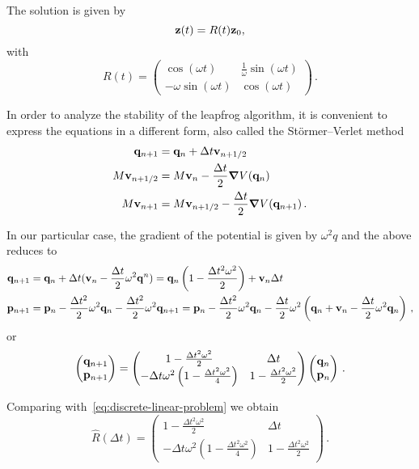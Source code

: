 \documentclass[class=report, crop=false]{standalone}
\begin{document}
The solution is given by
\[
\vb{z}(t) = R(t) \vb{z}_0,
\]
with
\[
R(t) =
\begin{pmatrix}
  \cos(\omega t) & \frac{1}{\omega} \sin(\omega t) \\
  -\omega \sin(\omega t) & \cos(\omega t)
\end{pmatrix}\,.
\]

In order to analyze the stability of the leapfrog algorithm, it is convenient to
express the equations in a different form, also called the Störmer–Verlet method
\begin{align*}
  \vb{q}_{n+1} &= \vb{q}_n + \Delta t \vb{v}_{n+1/2} \\
  M \vb{v}_{n+1/2} &= M \vb{v}_n - \frac{\Delta t}{2} \grad{V(\vb{q}_n)} \\
  M \vb{v}_{n+1} &= M \vb{v}_{n+1/2} - \frac{\Delta t}{2} \grad{V(\vb{q}_{n+1})}\,.
\end{align*}

In our particular case, the gradient of the potential is given by
\(\omega^2 q\) and the above reduces to
\begin{align*}
  \vb{q}_{n+1} &= \vb{q}_n + \Delta t (\vb{v}_n - \frac{\Delta t}{2} \omega^2 \vb{q}^n) =
  \vb{q}_n \left(1 - \frac{\Delta t^2 \omega^2}{2}\right) + \vb{v}_n \Delta t \\
  \vb{p}_{n+1} &= \vb{p}_n - \frac{\Delta t^2}{2} \omega^2 \vb{q}_n
  -\frac{\Delta t^2}{2} \omega^2 \vb{q}_{n+1} =
  \vb{p}_n - \frac{\Delta t^2}{2} \omega^2 \vb{q}_n
  -\frac{\Delta t}{2}\omega^2 \left(\vb{q}_n+\vb{v}_n-\frac{\Delta t}{2}\omega^2 \vb{q}_n\right)\,,
\end{align*}
or
\[
\begin{pmatrix}
  \vb{q}_{n+1} \\
  \vb{p}_{n+1}
\end{pmatrix} =
\begin{pmatrix}
  1 - \frac{\Delta t^2 \omega^2}{2} & \Delta t \\
  -\Delta t \omega^2 \left(1 - \frac{\Delta t^2 \omega^2}{4}\right) &
  1 - \frac{\Delta t^2 \omega^2}{2}
\end{pmatrix}
\begin{pmatrix}
  \vb{q}_n \\
  \vb{p}_n
\end{pmatrix}\,.
\]

Comparing with~\eqref{eq:discrete-linear-problem} we obtain
\[
\hat{R}(\Delta t) =
\begin{pmatrix}
  1 - \frac{\Delta t^2 \omega^2}{2} & \Delta t \\
  -\Delta t \omega^2 \left(1 - \frac{\Delta t^2 \omega^2}{4}\right) &
  1 - \frac{\Delta t^2 \omega^2}{2}
\end{pmatrix}\,.
\]
\end{document}
